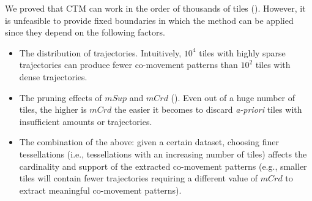 \documentclass[preprint,12pt,authoryear]{elsarticle} %
\begin{document}
We proved that CTM can work in the order of thousands of tiles ().
However, it is unfeasible to provide fixed boundaries in which the method can be applied since they depend on the following factors.
\begin{itemize}
    \item The distribution of trajectories. Intuitively, $10^4$ tiles with highly sparse trajectories can produce fewer co-movement patterns than $10^2$ tiles with dense trajectories. %
    \item The pruning effects of $mSup$ and $mCrd$ (). Even out of a huge number of tiles, the higher is $mCrd$ the easier it becomes to discard \textit{a-priori} tiles with insufficient amounts or trajectories.
    \item The combination of the above: given a certain dataset, choosing finer tessellations (i.e., tessellations with an increasing number of tiles) affects the cardinality and support of the extracted co-movement patterns (e.g., smaller tiles will contain fewer trajectories requiring a different value of $mCrd$ to extract meaningful co-movement patterns).
\end{itemize}
\end{document}

